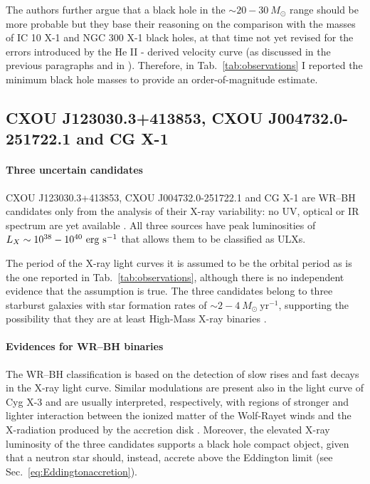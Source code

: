 \documentclass[a4paper,titlepage]{book}     	%
\newcommand{\sun}{\ensuremath{_\odot}}
\newcommand{\msun}{\ensuremath{M\sun}}
\newcommand{\yr}{\text{yr}}
\begin{document}
The authors further argue that a black hole in the $\sim 20-30~\msun$ range should be more probable but they base their reasoning on the comparison with the masses of IC 10 X-1 and NGC 300 X-1 black holes, at that time not yet revised for the errors introduced by the He II - derived velocity curve (as discussed in the previous paragraphs and in \cite{ICX10X-1_Laycock2015_revisited,NGC300X-1_Binder2021_BHpreciso}). Therefore, in Tab.\ \ref{tab:observations} I reported the minimum black hole masses to provide an order-of-magnitude estimate.



\subsection{CXOU J123030.3+413853, CXOU J004732.0-251722.1 and CG X-1}\label{subsec:uncertainWRcandidates}

\paragraph{Three uncertain candidates} CXOU J123030.3+413853, CXOU J004732.0-251722.1 and CG X-1 are WR--BH candidates only from the analysis of their X-ray variability: no UV, optical or IR spectrum are yet available \cite{observations}. All three sources have peak luminosities of $L_X \sim 10^{38}-10^{40}~\rm erg~s^{-1}$ that allows them to be classified as ULXs. 

The period of the X-ray light curves it is assumed to be the orbital period as is the one reported in Tab.\ \ref{tab:observations}, although there is no independent evidence that the assumption is true. The three candidates belong to three starburst galaxies with star formation rates of $\sim 2-4~\msun~\yr^{-1}$, supporting the possibility that they are at least High-Mass X-ray binaries \cite{observationsZSFR_Mapelli2010a}.

\paragraph{Evidences for WR--BH binaries} The WR--BH classification is based on the detection of slow rises and fast decays in the X-ray light curve. Similar modulations are present also in the light curve of Cyg X-3 and are usually interpreted, respectively, with regions of stronger and lighter interaction between the ionized matter of the Wolf-Rayet winds and the X-radiation produced by the accretion disk \cite{observations}. Moreover, the elevated X-ray luminosity of the three candidates supports a black hole compact object, given that a neutron star should, instead, accrete above the Eddington limit (see Sec.\ \ref{eq:Eddingtonaccretion}).
\end{document}
